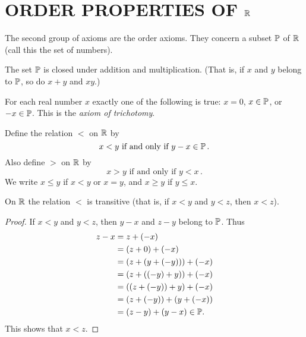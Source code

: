 \chapter{ORDER PROPERTIES OF $\mathbb{R}$}\label{order_R}

 \setcounter{section}{1}
 \setcounter{thm}{0}


The second group of axioms are the order axioms. They concern a subset $\mathbb{P}$ of $\mathbb{R}$ (call
this the set of
 numbers).

\begin{ax}[V]  The set $\mathbb{P}$ is closed under addition and multiplication.  (That is, if $x$ and
$y$ belong to $\mathbb{P}$, so do $x + y$  and $xy$.)
\end{ax}

\begin{ax}[VI]\label{axiom_trichot} For each real number $x$ exactly one of the following is true:
$x = 0$, $x \in \mathbb{P}$, or  $-x \in \mathbb{P}$.  This is the
\emph{axiom of trichotomy}.
\end{ax}

Define the relation $<$ on $\mathbb{R}$ by
  \[ x < y  \text{ if and only if }  y - x \in \mathbb{P}\,. \]
Also define $>$ on $\mathbb{R}$ by
  \[ x > y \text{ if and only if } y < x\,. \]
We write $x \le y$ if $x < y$ or $x = y$, and $x \ge y$ if $y \le x$.

\begin{prop}\label{lt_tran} On $\mathbb{R}$ the relation $<$ is transitive (that is, if $x < y$ and
$y < z$, then $x < z$).
\end{prop}

\begin{proof} If $x < y$ and $y < z$, then $y - x$ and $z - y$ belong to $\mathbb{P}$.  Thus
  \begin{align*}
      z - x &= z +(-x) \\
            &= (z + 0) + (-x) \\
            &= (z + (y + (-y))) + (-x) \\
            &= (z + ((-y) + y)) + (-x) \\
            &= ((z + (-y)) + y) + (-x) \\
            &= (z + (-y)) + (y + (-x)) \\
            &= (z - y) + (y - x) \in \mathbb{P}.
  \end{align*}
This shows that $x < z$.
\end{proof}

